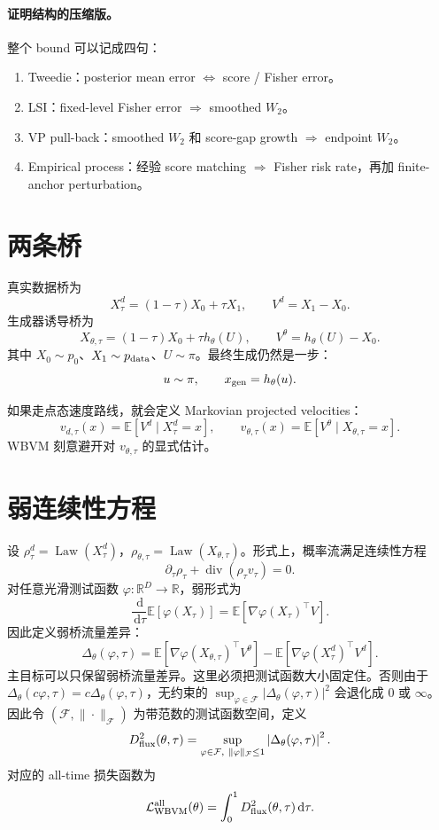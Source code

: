 \documentclass[UTF8,11pt]{ctexart}
\newcommand{\E}{\mathbb{E}}
\newcommand{\R}{\mathbb{R}}
\newcommand{\cF}{\mathcal{F}}
\newcommand{\cL}{\mathcal{L}}
\newcommand{\Law}{\operatorname{Law}}
\newcommand{\dd}{\,\mathrm d}
\begin{document}
\paragraph{证明结构的压缩版。}
整个 bound 可以记成四句：
\begin{enumerate}[leftmargin=2em]
\item Tweedie：posterior mean error \(\Longleftrightarrow\) score / Fisher error。
\item LSI：fixed-level Fisher error \(\Longrightarrow\) smoothed \(W_2\)。
\item VP pull-back：smoothed \(W_2\) 和 score-gap growth \(\Longrightarrow\) endpoint \(W_2\)。
\item Empirical process：经验 score matching \(\Longrightarrow\) Fisher risk rate，再加 finite-anchor perturbation。
\end{enumerate}

\section{两条桥}

真实数据桥为
\[
X_\tau^d=(1-\tau)X_0+\tau X_1,
\qquad
V^d=X_1-X_0.
\]
生成器诱导桥为
\[
X_{\theta,\tau}=(1-\tau)X_0+\tau h_\theta(U),
\qquad
V^\theta=h_\theta(U)-X_0.
\]
其中 \(X_0\sim p_0\)、\(X_1\sim p_{\rm data}\)、\(U\sim\pi\)。最终生成仍然是一步：
\[
u\sim\pi,\qquad x_{\rm gen}=h_\theta(u).
\]

如果走点态速度路线，就会定义 Markovian projected velocities：
\[
v_{d,\tau}(x)=\E[V^d\mid X_\tau^d=x],
\qquad
v_{\theta,\tau}(x)=\E[V^\theta\mid X_{\theta,\tau}=x].
\]
WBVM 刻意避开对 \(v_{\theta,\tau}\) 的显式估计。

\section{弱连续性方程}

设 \(\rho_\tau^d=\Law(X_\tau^d)\)，\(\rho_{\theta,\tau}=\Law(X_{\theta,\tau})\)。形式上，概率流满足连续性方程
\[
\partial_\tau \rho_\tau+\operatorname{div}(\rho_\tau v_\tau)=0.
\]
对任意光滑测试函数 \(\varphi:\R^D\to\R\)，弱形式为
\[
\frac{\dd}{\dd\tau}\E[\varphi(X_\tau)]
=
\E[\nabla\varphi(X_\tau)^\top V].
\]
因此定义弱桥流量差异：
\[
\Delta_\theta(\varphi,\tau)
=
\E[\nabla\varphi(X_{\theta,\tau})^\top V^\theta]
-
\E[\nabla\varphi(X_\tau^d)^\top V^d].
\]
主目标可以只保留弱桥流量差异。这里必须把测试函数大小固定住。否则由于
\(\Delta_\theta(c\varphi,\tau)=c\Delta_\theta(\varphi,\tau)\)，无约束的
\(\sup_{\varphi\in\cF}|\Delta_\theta(\varphi,\tau)|^2\) 会退化成 \(0\) 或 \(\infty\)。
因此令 \((\cF,\|\cdot\|_{\cF})\) 为带范数的测试函数空间，定义
\[
D_{\rm flux}^2(\theta,\tau)
=
\sup_{\varphi\in\cF,\ \|\varphi\|_{\cF}\le 1}
\left|
\Delta_\theta(\varphi,\tau)
\right|^2.
\]
对应的 all-time 损失函数为
\[
\cL_{\rm WBVM}^{\rm all}(\theta)
=
\int_0^1
D_{\rm flux}^2(\theta,\tau)
\dd\tau.
\]
\end{document}
